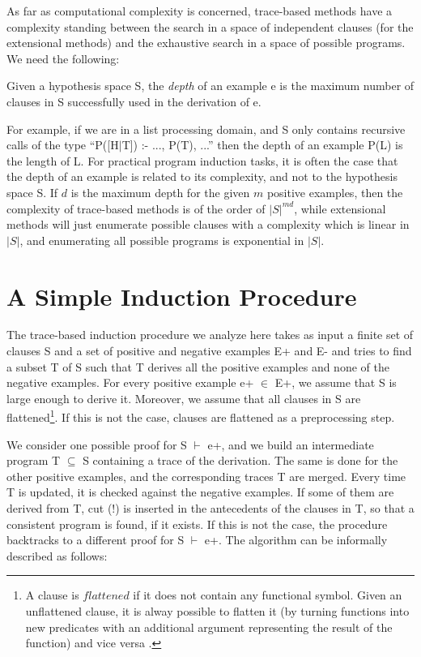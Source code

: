 As far as computational complexity is concerned, trace-based
methods have a complexity standing 
between the search in a space of independent
clauses (for the extensional methods) and the exhaustive search
in a space of possible programs. We need the following:
 
\begin{newdef}
Given a hypothesis space S, the {\em depth} of an example e
is the maximum number of clauses in S successfully used in the derivation
of e.
\end{newdef}
 
For example, if we are in a list processing domain, and
S only contains
recursive calls
of the type
``P([H$|$T]) :- ..., P(T), ...''
then the depth of an example P(L) is the length of L.
For practical program induction tasks, it
is often the case that the depth of an example is
related to its complexity, and not to the hypothesis space S.
If $d$ is the maximum depth for the given $m$ positive examples,
then the complexity of trace-based methods is of the order
of $|S|^{md}$, while extensional methods will just enumerate
possible clauses with a complexity which is linear in $|S|$, and
enumerating all possible programs is exponential in $|S|$.
 
\section{ A Simple Induction Procedure }
 
The trace-based induction procedure we analyze here
takes as input a finite set of clauses S 
and a set of positive and negative
examples E+ and E- and tries to find a subset T of S such that T derives
all the positive examples and none of the negative examples. 
For every positive example e+ $\in$ E+,  we assume that S is large enough
to derive it. Moreover, we assume that all clauses in S are
flattened\footnote{A clause is $flattened$ if it does not contain
any functional symbol. Given an unflattened clause, it is alway possible
to flatten it (by turning functions into new predicates with an additional
argument representing the result of the function) 
and vice versa \cite{rouvmljo94}.}. 
If this is not the case, clauses are flattened
as a preprocessing step. 
 
We consider one possible proof for S $\vdash$ e+, and we
build an intermediate program T $\subseteq$ S containing a trace of
the derivation. The same is done
for the other positive examples, and the corresponding traces T are
merged.
Every time T is updated, it is checked against the negative
examples. If some of them are derived from T, 
cut (!) is inserted in the antecedents of the clauses in T,
so that a consistent program
is found, if it exists.
If this is not the case, the procedure backtracks to 
a different proof for S $\vdash$ e+.
The algorithm can be informally described as follows:\\
 
